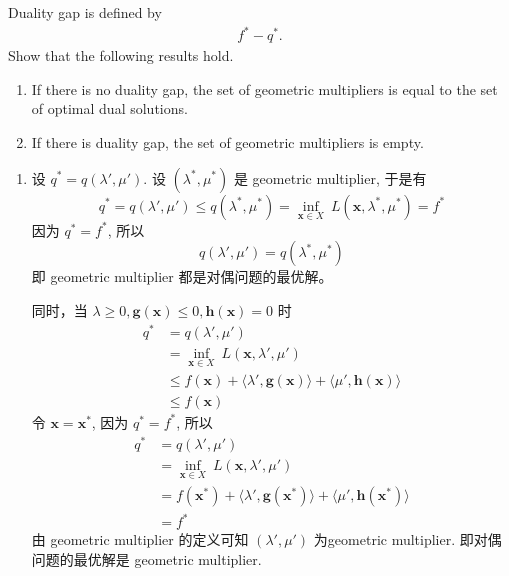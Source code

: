 \documentclass[11pt,letter,notitlepage]{article}
\begin{document}
\newpage
\begin{exercise}
	Duality gap is defined by
	\begin{align*}
		f^*-q^*.
	\end{align*}
	Show that the following results hold.
	\begin{enumerate}
		\item If there is no duality gap, the set of geometric multipliers is equal to the set of optimal dual solutions.
		\item If there is duality gap, the set of geometric multipliers is empty.
	\end{enumerate}
\end{exercise}

\begin{solution}
	\begin{enumerate}
		\item 设 $q^*=q(\lambda',\mu')$. 设 $(\lambda^*,\mu^*)$ 是 geometric multiplier, 于是有
		      $$q^*=q(\lambda',\mu') \leq q(\lambda^*,\mu^*)
			      =\inf_{\mathbf{x}\in X}\ L(\mathbf{x},\lambda^*,\mu^*)=f^*$$
		      因为 $q^*=f^*$, 所以
		      $$q(\lambda',\mu') = q(\lambda^*,\mu^*)$$
		      即 geometric multiplier 都是对偶问题的最优解。

		      同时，当 $\lambda \geq 0, \mathbf{g}(\mathbf{x})\leq0, \mathbf{h}(\mathbf{x})=0$ 时
		      $$\begin{aligned}
				      q^*
				       & =q(\lambda',\mu')                                                                                                \\
				       & =\inf_{\mathbf{x}\in X}\ L(\mathbf{x},\lambda',\mu')                                                             \\
				       & \leq f(\mathbf{x})+\langle \lambda',\mathbf{g}(\mathbf{x}) \rangle + \langle \mu',\mathbf{h}(\mathbf{x}) \rangle \\
				       & \leq f(\mathbf{x})
			      \end{aligned}$$
		      令 $\mathbf{x}=\mathbf{x}^*$, 因为 $q^*=f^*$, 所以
		      $$\begin{aligned}
				      q^*
				       & =q(\lambda',\mu')                                                                                                   \\
				       & =\inf_{\mathbf{x}\in X}\ L(\mathbf{x},\lambda',\mu')                                                                \\
				       & = f(\mathbf{x}^*)+\langle \lambda',\mathbf{g}(\mathbf{x}^*) \rangle + \langle \mu',\mathbf{h}(\mathbf{x}^*) \rangle \\
				       & = f^*
			      \end{aligned}$$
		      由 geometric multiplier 的定义可知 $(\lambda',\mu')$ 为geometric multiplier. 即对偶问题的最优解是 geometric multiplier.


\end{enumerate}
\end{solution}
\end{document}
